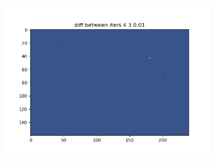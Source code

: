 \documentclass[12pt]{article}
\begin{document}
\begin{section}{4.6}
\begin{figure}[H]
	\begin{subfigure}{.5\textwidth}
		\centering
		\includegraphics[width=.8\linewidth]{43diff.png}
		\label{34diff}
	\end{subfigure}
	\label{fig:test}
\end{figure}


\end{section}
\end{document}
